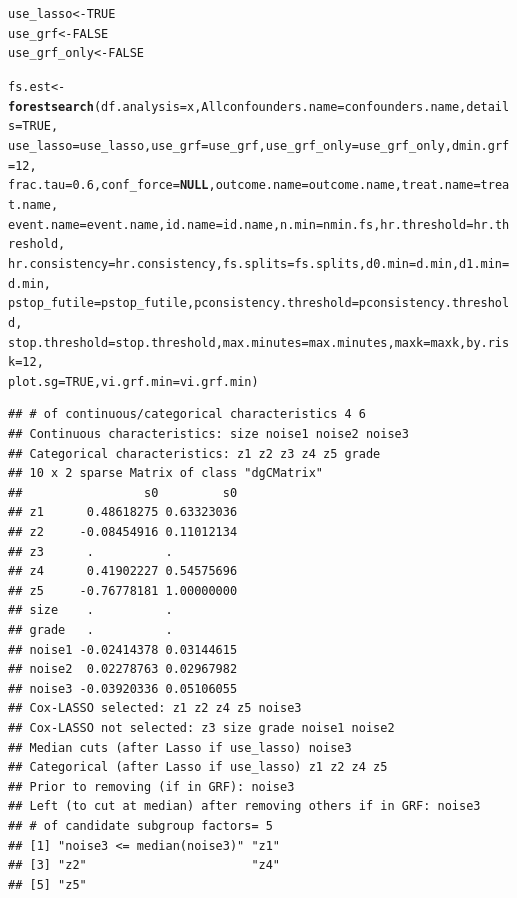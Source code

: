 \documentclass[smallextended]{svjour3}
\makeatletter
\newcommand{\hlnum}[1]{\textcolor[rgb]{0.686,0.059,0.569}{#1}}%
\newcommand{\hlstd}[1]{\textcolor[rgb]{0.345,0.345,0.345}{#1}}%
\newcommand{\hlkwa}[1]{\textcolor[rgb]{0.161,0.373,0.58}{\textbf{#1}}}%
\newcommand{\hlkwb}[1]{\textcolor[rgb]{0.69,0.353,0.396}{#1}}%
\newcommand{\hlkwc}[1]{\textcolor[rgb]{0.333,0.667,0.333}{#1}}%
\newcommand{\hlkwd}[1]{\textcolor[rgb]{0.737,0.353,0.396}{\textbf{#1}}}%
\newenvironment{kframe}{%
 \def\at@end@of@kframe{}%
 \ifinner\ifhmode%
  \def\at@end@of@kframe{\end{minipage}}%
  \begin{minipage}{\columnwidth}%
 \fi\fi%
 \def\FrameCommand##1{\hskip\@totalleftmargin \hskip-\fboxsep
 \colorbox{shadecolor}{##1}\hskip-\fboxsep
     \hskip-\linewidth \hskip-\@totalleftmargin \hskip\columnwidth}%
 \MakeFramed {\advance\hsize-\width
   \@totalleftmargin\z@ \linewidth\hsize
   \@setminipage}}%
 {\par\unskip\endMakeFramed%
 \at@end@of@kframe}
\newenvironment{knitrout}{}{} %
\makeatother
\begin{document}
\begin{knitrout}
\begin{kframe}
\begin{alltt}
\hlstd{use_lasso} \hlkwb{<-} \hlnum{TRUE}
\hlstd{use_grf} \hlkwb{<-} \hlnum{FALSE}
\hlstd{use_grf_only} \hlkwb{<-} \hlnum{FALSE}

\hlstd{fs.est} \hlkwb{<-} \hlkwd{forestsearch}\hlstd{(}\hlkwc{df.analysis} \hlstd{= x,} \hlkwc{Allconfounders.name} \hlstd{= confounders.name,} \hlkwc{details} \hlstd{=} \hlnum{TRUE}\hlstd{,}
    \hlkwc{use_lasso} \hlstd{= use_lasso,} \hlkwc{use_grf} \hlstd{= use_grf,} \hlkwc{use_grf_only} \hlstd{= use_grf_only,} \hlkwc{dmin.grf} \hlstd{=} \hlnum{12}\hlstd{,}
    \hlkwc{frac.tau} \hlstd{=} \hlnum{0.6}\hlstd{,} \hlkwc{conf_force} \hlstd{=} \hlkwa{NULL}\hlstd{,} \hlkwc{outcome.name} \hlstd{= outcome.name,} \hlkwc{treat.name} \hlstd{= treat.name,}
    \hlkwc{event.name} \hlstd{= event.name,} \hlkwc{id.name} \hlstd{= id.name,} \hlkwc{n.min} \hlstd{= nmin.fs,} \hlkwc{hr.threshold} \hlstd{= hr.threshold,}
    \hlkwc{hr.consistency} \hlstd{= hr.consistency,} \hlkwc{fs.splits} \hlstd{= fs.splits,} \hlkwc{d0.min} \hlstd{= d.min,} \hlkwc{d1.min} \hlstd{= d.min,}
    \hlkwc{pstop_futile} \hlstd{= pstop_futile,} \hlkwc{pconsistency.threshold} \hlstd{= pconsistency.threshold,}
    \hlkwc{stop.threshold} \hlstd{= stop.threshold,} \hlkwc{max.minutes} \hlstd{= max.minutes,} \hlkwc{maxk} \hlstd{= maxk,} \hlkwc{by.risk} \hlstd{=} \hlnum{12}\hlstd{,}
    \hlkwc{plot.sg} \hlstd{=} \hlnum{TRUE}\hlstd{,} \hlkwc{vi.grf.min} \hlstd{= vi.grf.min)}
\end{alltt}
\begin{verbatim}
## # of continuous/categorical characteristics 4 6 
## Continuous characteristics: size noise1 noise2 noise3 
## Categorical characteristics: z1 z2 z3 z4 z5 grade 
## 10 x 2 sparse Matrix of class "dgCMatrix"
##                 s0         s0
## z1      0.48618275 0.63323036
## z2     -0.08454916 0.11012134
## z3      .          .         
## z4      0.41902227 0.54575696
## z5     -0.76778181 1.00000000
## size    .          .         
## grade   .          .         
## noise1 -0.02414378 0.03144615
## noise2  0.02278763 0.02967982
## noise3 -0.03920336 0.05106055
## Cox-LASSO selected: z1 z2 z4 z5 noise3 
## Cox-LASSO not selected: z3 size grade noise1 noise2 
## Median cuts (after Lasso if use_lasso) noise3 
## Categorical (after Lasso if use_lasso) z1 z2 z4 z5 
## Prior to removing (if in GRF): noise3 
## Left (to cut at median) after removing others if in GRF: noise3 
## # of candidate subgroup factors= 5 
## [1] "noise3 <= median(noise3)" "z1"                      
## [3] "z2"                       "z4"                      
## [5] "z5"                      

\end{verbatim}
\end{kframe}
\end{knitrout}
\end{document}
